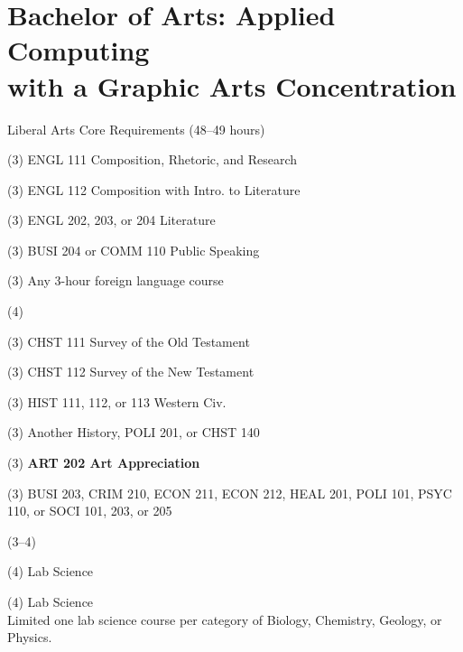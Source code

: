 \label{program:ba-app-graph}%
\section*{Bachelor of Arts: Applied Computing\\with a Graphic Arts Concentration}

\begin{reqgroup}{Liberal Arts Core Requirements (48--49 hours)}
\begin{checklist}
\begin{minipage}[t]{0.5\linewidth}
	\item (3) ENGL 111 Composition, Rhetoric, and Research
	\item (3) ENGL 112 Composition with Intro\@. to Literature
	\item (3) ENGL 202, 203, or 204 Literature
	\item (3) BUSI 204 or COMM 110 Public Speaking
	\item (3) Any 3-hour foreign language course
	\item (4) 
	\item (3) CHST 111  Survey of the Old Testament
	\item (3) CHST 112  Survey of the New Testament
	\item (3) HIST 111, 112, or 113 Western Civ.
\end{minipage}
\begin{minipage}[t]{0.5\linewidth}
	\item (3)	Another History, POLI 201, or CHST 140
	\item (3)	\textbf{ART 202 Art Appreciation}
	\item (3)	BUSI 203, CRIM 210, ECON 211, ECON 212, HEAL 201, POLI 101, PSYC 110, or SOCI 101, 203, or 205
	\item (3--4)	
	\item (4)	Lab Science
	\item (4)	Lab Science\\Limited one lab science course per category of Biology, Chemistry,
Geology, or Physics.
\end{minipage}
\end{checklist}
\end{reqgroup}


